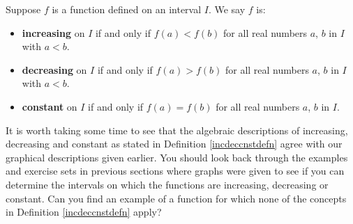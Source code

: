 \colorbox{ResultColor}{\bbm


\begin{defn}

\label{incdeccnstdefn}

Suppose $f$ is a function defined on an interval $I$.  We say $f$ is:

\begin{itemize}

\item {} \textbf{increasing} on $I$ if and only if $f(a) < f(b)$ for all real numbers $a$, $b$ in $I$ with $a < b$.

\item {} \textbf{decreasing} on $I$ if and only if $f(a) > f(b)$ for all real numbers $a$, $b$ in $I$ with $a < b$.

\item {} \textbf{constant} on $I$ if and only if $f(a) = f(b)$ for all real numbers $a$, $b$ in $I$.

\end{itemize}

\end{defn}

\ebm}

\medskip

It is worth taking some time to see that the algebraic descriptions of increasing, decreasing and constant as stated in Definition \ref{incdeccnstdefn} agree with our graphical descriptions given earlier.  You should look back through the examples and exercise sets in previous sections where graphs were given to see if you can determine the intervals on which the functions are increasing, decreasing or constant.  Can you find an example of a function for which none of the concepts in Definition \ref{incdeccnstdefn} apply?

\bigskip

